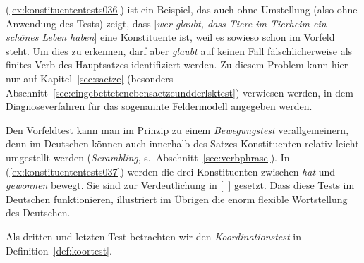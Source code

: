 \begin{exe}
  \ex\label{ex:konstituententests034}
  \begin{xlist}
  \end{xlist}
\end{exe}

(\ref{ex:konstituententests036}) ist ein Beispiel, das auch ohne Umstellung (also ohne Anwendung des Tests) zeigt, dass [\textit{wer glaubt, dass Tiere im Tierheim ein schönes Leben haben}] eine Konstituente ist, weil es sowieso schon im Vorfeld steht.
Um dies zu erkennen, darf aber \textit{glaubt} auf keinen Fall fälschlicherweise als finites Verb des Hauptsatzes identifiziert werden.
Zu diesem Problem kann hier nur auf Kapitel~\ref{sec:saetze} (besonders Abschnitt~\ref{sec:eingebettetenebensaetzeundderlsktest}) verwiesen werden, in dem Diagnoseverfahren für das sogenannte Feldermodell angegeben werden.

Den Vorfeldtest kann man im Prinzip zu einem \textit{Bewegungstest} verallgemeinern, denn im Deutschen können auch innerhalb des Satzes Konstituenten relativ leicht umgestellt werden (\textit{Scrambling}, s.\ Abschnitt~\ref{sec:verbphrase}).
In (\ref{ex:konstituententests037}) werden die drei Konstituenten zwischen \textit{hat} und \textit{gewonnen} bewegt.
Sie sind zur Verdeutlichung in [~] gesetzt.
Dass diese Tests im Deutschen funktionieren, illustriert im Übrigen die enorm flexible Wortstellung des Deutschen.

\begin{exe}
  \ex\label{ex:konstituententests037}
  \begin{xlist}
  \end{xlist}
\end{exe}

Als dritten und letzten Test betrachten wir den \textit{Koordinationstest} in Definition~\ref{def:koortest}.

